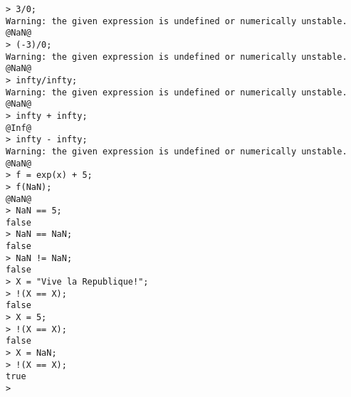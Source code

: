 \begin{center}\begin{minipage}{15cm}\begin{Verbatim}[frame=single]
> 3/0;
Warning: the given expression is undefined or numerically unstable.
@NaN@
> (-3)/0;
Warning: the given expression is undefined or numerically unstable.
@NaN@
> infty/infty;
Warning: the given expression is undefined or numerically unstable.
@NaN@
> infty + infty;
@Inf@
> infty - infty;
Warning: the given expression is undefined or numerically unstable.
@NaN@
> f = exp(x) + 5;
> f(NaN);
@NaN@
> NaN == 5;
false
> NaN == NaN;
false
> NaN != NaN;
false
> X = "Vive la Republique!";
> !(X == X);
false
> X = 5;
> !(X == X);
false
> X = NaN;
> !(X == X);
true
> 
\end{Verbatim}
\end{minipage}\end{center}
